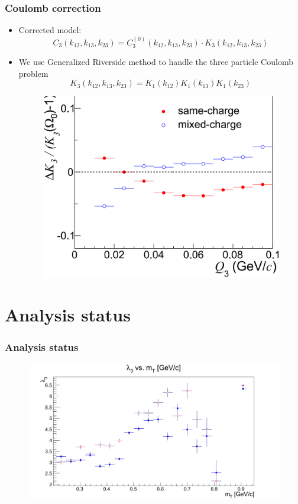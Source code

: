 \documentclass{beamer}
\begin{document}
\begin{frame}
\frametitle{Coulomb correction}
\begin{itemize}
\setlength{\itemsep}{16pt}
\item Corrected model:
\begin{equation}
C_3(k_{12}, k_{13}, k_{23}) = C_3^{(0)}(k_{12}, k_{13}, k_{23})\cdot K_3(k_{12}, k_{13}, k_{23})
\end{equation}
\item We use Generalized Riverside method to handle the three particle Coulomb problem
\begin{equation}
K_3(k_{12}, k_{13}, k_{23}) = K_1(k_{12})K_1(k_{13})K_1(k_{23})
\end{equation}
\begin{figure}
\includegraphics[scale=0.3]{pic/KKK}
\end{figure}
\end{itemize}
\end{frame}

\section{Analysis status}

\begin{frame}
\frametitle{Analysis status}
\begin{figure}
\includegraphics[scale=0.3]{pic/l3}
\end{figure}
\end{frame}
\end{document}
